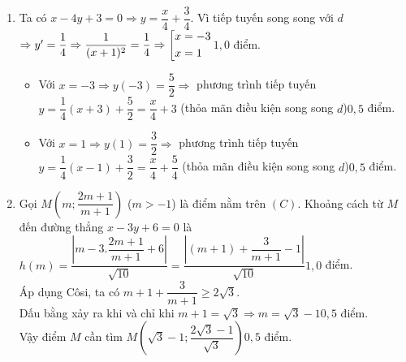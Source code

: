 \begin{bt}
{\begin{enumerate}
\begin{center}
			\end{center}
			\item Ta có $x-4y+3=0\Rightarrow y=\dfrac{x}{4}+\dfrac{3}{4}$. Vì tiếp tuyến song song với $d$\\
			$\Rightarrow y'=\dfrac{1}{4}\Rightarrow \dfrac{1}{(x+1)^{2}}=\dfrac{1}{4}\Rightarrow \left[\begin{aligned}&x=-3\\ &x=1\end{aligned}\right.$\dotfill $1,0$ điểm.
			\begin{itemize}
				\item Với $x=-3\Rightarrow y(-3)=\dfrac{5}{2}\Rightarrow$ phương trình tiếp tuyến $y=\dfrac{1}{4}(x+3)+\dfrac{5}{2}=\dfrac{x}{4}+3$ (thỏa mãn điều kiện song song $d$)\dotfill $0,5$ điểm.
				\item Với $x=1\Rightarrow y(1)=\dfrac{3}{2}\Rightarrow$ phương trình tiếp tuyến $y=\dfrac{1}{4}(x-1)+\dfrac{3}{2}=\dfrac{x}{4}+\dfrac{5}{4}$ (thỏa mãn điều kiện song song $d$)\dotfill $0,5$ điểm.
			\end{itemize}
			\item Gọi $M\left(m;\dfrac{2m+1}{m+1}\right)$ ($m>-1$) là điểm nằm trên $(C)$. Khoảng cách từ $M$ đến đường thẳng $x-3y+6=0$ là $h(m)=\dfrac{\left|m-3.\dfrac{2m+1}{m+1}+6\right|}{\sqrt{10}}=\dfrac{\left|(m+1)+\dfrac{3}{m+1}-1\right|}{\sqrt{10}}$\dotfill $1,0$ điểm.\\
			Áp dụng Côsi, ta có $m+1+\dfrac{3}{m+1}\geq 2\sqrt{3}$.\\
			Dấu bằng xảy ra khi và chỉ khi $m+1=\sqrt{3}\Rightarrow m=\sqrt{3}-1$\dotfill $0,5$ điểm.\\
			Vậy điểm $M$ cần tìm $M\left(\sqrt{3}-1;\dfrac{2\sqrt{3}-1}{\sqrt{3}}\right)$\dotfill $0,5$ điểm.
		\end{enumerate}
	}
\end{bt}
